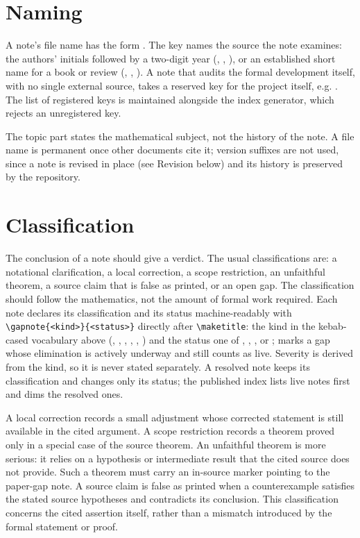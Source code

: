 \documentclass{article}
\begin{document}
\section{Naming}

A note's file name has the form . The key names the
source the note examines: the authors' initials followed by a two-digit year
(, , ), or an established short name
for a book or review (, , ). A note that
audits the formal development itself, with no single external source, takes
a reserved key for the project itself, e.g. . The list of registered keys is maintained alongside
the index generator, which rejects an unregistered key.

The topic part states the mathematical subject, not the history of the note.
A file name is permanent once other documents cite it; version suffixes are
not used, since a note is revised in place (see Revision below) and its
history is preserved by the repository.

\section{Classification}

The conclusion of a note should give a verdict. The usual classifications are:
a notational clarification, a local correction, a scope restriction, an
unfaithful theorem, a source claim that is false as printed, or an open gap.
The classification should follow the mathematics, not the amount of formal
work required. Each note declares its classification and its status
machine-readably with \verb|\gapnote{<kind>}{<status>}| directly after
\verb|\maketitle|: the kind in the kebab-cased vocabulary above
(, , ,
, , ) and the status
one of , , , or ;
 marks a gap whose elimination is actively underway and still
counts as live. Severity is derived from the kind, so it is never stated
separately. A resolved note keeps its classification and changes only its
status; the published index lists live notes first and dims the resolved
ones.

A local correction records a small adjustment whose corrected statement is still
available in the cited argument. A scope restriction records a theorem proved
only in a special case of the source theorem. An unfaithful theorem is more
serious: it relies on a hypothesis or intermediate result that the cited source
does not provide. Such a theorem must carry an in-source marker pointing to the
paper-gap note. A source claim is false as printed when a counterexample
satisfies the stated source hypotheses and contradicts its conclusion. This
classification concerns the cited assertion itself, rather than a mismatch
introduced by the formal statement or proof.
\end{document}
